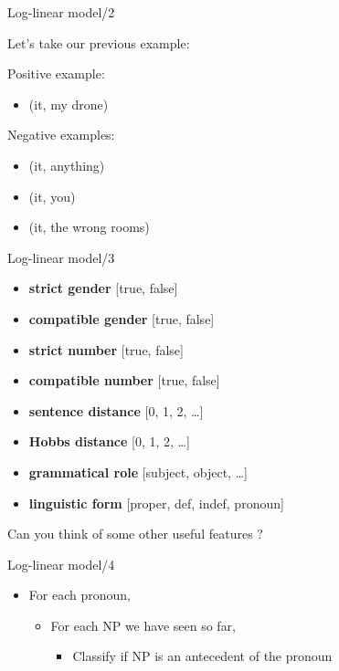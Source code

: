 \documentclass[dvipsnames, 10pt, compress]{beamer}
\begin{document}
\begin{frame}{Log-linear model/2} %

Let's take our previous example:

Positive example:
\begin{itemize}
 \item (it, my drone)
\end{itemize}

Negative examples:
\begin{itemize}
 \item (it, anything)
 \item (it, you)
 \item (it, the wrong rooms)
\end{itemize}

\end{frame}

\begin{frame}{Log-linear model/3} %

\begin{itemize}
  \item \textbf{strict gender} [true, false]
  \item \textbf{compatible gender} [true, false]
  \item \textbf{strict number} [true, false]
  \item \textbf{compatible number} [true, false]
  \item \textbf{sentence distance} [0, 1, 2, \ldots]
  \item \textbf{Hobbs distance} [0, 1, 2, \ldots] 
  \item \textbf{grammatical role} [subject, object, \ldots] 
  \item \textbf{linguistic form} [proper, def, indef, pronoun]
\end{itemize}

Can you think of some other useful features ? 

\end{frame}

\begin{frame}{Log-linear model/4} %

\begin{itemize}
  \item For each pronoun,
  \begin{itemize}
     \item For each NP we have seen so far,
     \begin{itemize}
       \item Classify if NP is an antecedent of the pronoun
     \end{itemize}
  \end{itemize}
\end{itemize}


\end{frame}
\end{document}
